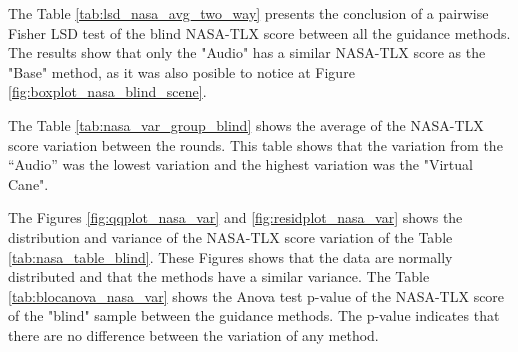 The Table \ref{tab:lsd_nasa_avg_two_way} presents the conclusion of a pairwise Fisher LSD test of the blind NASA-TLX score between all the guidance methods. The results show that only the "Audio" has a similar NASA-TLX score as the "Base" method, as it was also posible to notice at Figure \ref{fig:boxplot_nasa_blind_scene}.



The Table \ref{tab:nasa_var_group_blind} shows the average of the NASA-TLX score variation between the rounds. This table shows that the variation from the “Audio” was the lowest variation and the highest variation was the "Virtual Cane".



The Figures \ref{fig:qqplot_nasa_var} and \ref{fig:residplot_nasa_var} shows the distribution and variance of the NASA-TLX score variation of the Table \ref{tab:nasa_table_blind}. These Figures shows that the data are normally distributed and that the methods have a similar variance.
The Table \ref{tab:blocanova_nasa_var} shows the Anova test p-value of the NASA-TLX score of the "blind" sample between the guidance methods. The p-value indicates that there are no difference between the variation of any method. 



